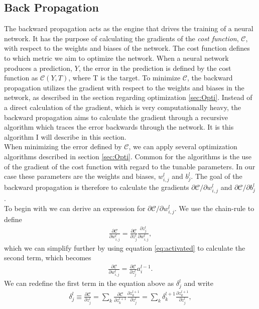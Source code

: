 \subsection{Back Propagation}\label{subsec:BP}
The backward propagation acts as the engine that drives the training of a neural network. It has the purpose
of calculating the gradients of the \emph{cost function}, $\mathcal{C}$, with respect to the weights and biases of the network. 
The cost function defines to which metric we aim to optimize the network. When a neural network produces a prediction, $Y$, the error in the prediction
is defined by the cost function as $\mathcal{C}\left(Y, T\right)$, where T is the target. To minimize $\mathcal{C}$, the 
backward propagation utilizes the gradient with respect to the weights and biases in the network, as described in the section 
regarding optimization \ref{sec:Opti}. Instead of a direct calculation of the gradient, which is very computationally heavy, 
the backward propagation aims to calculate the gradient through a recursive algorithm which traces the error backwards through 
the network. It is this algorithm I will describe in this section.
\\
When minimizing the error defined by $\mathcal{C}$, we can apply several optimization algorithms described in 
section \ref{sec:Opti}. Common for the algorithms is the use of the gradient of the cost function with regard to 
the tunable parameters. In our case these parameters are the weights and biases, $w_{i,j}^l$ and $b^l_j$. The goal of 
the backward propagation is therefore to calculate the gradients $\partial \mathcal{C}/\partial w_{i,j}^l$ and
$\partial \mathcal{C}/\partial b^l_j$. 
\\
To begin with we can derive an expression for $\partial \mathcal{C}/\partial w_{i,j}^l$. We use the chain-rule to define 
\begin{align*}
    \frac{\partial \mathcal{C}}{\partial w_{i,j}^l} = \frac{\partial \mathcal{C}}{\partial z^l_j} \frac{\partial z^l_j}{\partial w_{i,j}^l},
\end{align*}
which we can simplify further by using equation \ref{eq:activated} to calculate the second term, which becomes
\begin{align*}
    \frac{\partial \mathcal{C}}{\partial w_{i,j}^l} = \frac{\partial \mathcal{C}}{\partial z^l_j} a^{l-1}_i.
\end{align*}
We can redefine the first term in the equation above as $\delta_j^l$ and write
\begin{align*}
    \delta_j^l \equiv \frac{\partial \mathcal{C}}{\partial z^l_j}
               = \sum_k \frac{\partial \mathcal{C}}{\partial z^{l+1}_k}\frac{\partial z_k^{l+1}}{\partial z^l_j}  
               = \sum_k \delta_k^{l+1}\frac{\partial z_k^{l+1}}{\partial z^l_j},
\end{align*}
